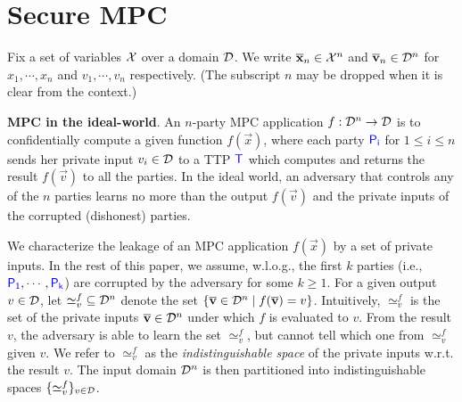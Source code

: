 \section{Secure MPC} \label{sec:preli}






Fix a set of variables $\mathcal{X}$ over a domain $\mathcal{D}$. We write $\overline{\bf{x}}_n\in\mathcal{X}^n$ and $\overline{\bf{v}}_n\in \mathcal{D}^n$ for $x_1, \cdots, x_n$
and $v_1, \cdots, v_n$ respectively.
(The subscript $n$ may be dropped %
when it is clear from the context.)


\smallskip
\noindent
{\bf MPC in the ideal-world}. An $n$-party MPC application $f:\mathcal{D}^n\rightarrow \mathcal{D}$ is to confidentially compute a given function $f(\vec{x})$, where each party ${\textcolor{blue}{\sf P_{i}}}$ for $1\leq i\leq n$ sends her
private input $v_i\in \mathcal{D}$ to a TTP ${\textcolor{blue}{\sf T}}$ which
computes and returns the result $f(\vec{v})$ to all the parties.
In the ideal world, an adversary that controls  any of the $n$ parties
learns no more than the output $f(\vec{v})$ and the private inputs of the corrupted (dishonest) parties.

We characterize the leakage of an MPC application $f(\vec{x})$  by
a set of private inputs. %
In the rest of this paper, we assume, w.l.o.g.,
the first $k$ parties (i.e., ${\textcolor{blue}{\sf P_{1}}},\cdots, {\textcolor{blue}{\sf P_{k}}}$) are corrupted by the adversary for some $k\geq 1$.
%
For a given output $v\in \mathcal{D}$, let ${\simeq_v^f}\subseteq \mathcal{D}^n$ denote the set
$\{\overline{\bf{v}}\in \mathcal{D}^n\mid f(\overline{\bf{v}})=v\}$.
Intuitively, ${\simeq_v^f}$ is the set of the private inputs $\overline{\bf{v}}\in \mathcal{D}^n$ under which  $f$ is evaluated to $v$.
From the result $v$, the adversary is able to learn the set ${\simeq_v^f}$, but cannot
tell which one from ${\simeq_v^f}$ given $v$. We refer to ${\simeq_v^f}$ as the \emph{indistinguishable space} of the private inputs w.r.t. the result $v$.
The input domain $\mathcal{D}^n$ is then partitioned into indistinguishable spaces $\{\simeq_v^f\}_{ v\in \mathcal{D}}$.  %
%

